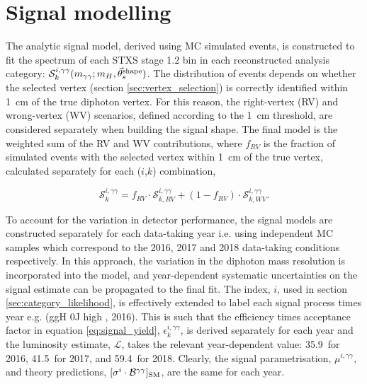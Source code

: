 \section{Signal modelling}\label{sec:sig_modelling}
The analytic signal model, derived using MC simulated events, is constructed to fit the \mgg spectrum of each STXS stage 1.2 bin in each reconstructed analysis category: $\mathcal{S}^{i,\gamma\gamma}_k(m_{\gamma\gamma};m_H,\vec{\theta}^{\rm{shape}}_s)$. The distribution of events depends on whether the selected vertex (section \ref{sec:vertex_selection}) is correctly identified within 1~cm of the true diphoton vertex. For this reason, the right-vertex (RV) and wrong-vertex (WV) scenarios, defined according to the 1~cm threshold, are considered separately when building the signal shape. The final model is the weighted sum of the RV and WV contributions, where $f_{RV}$ is the fraction of simulated events with the selected vertex within 1~cm of the true vertex, calculated separately for each ($i$,$k$) combination,

\begin{equation}
    \mathcal{S}^{i,\gamma\gamma}_k = f_{RV} \cdot \mathcal{S}^{i,\gamma\gamma}_{k,RV} + (1-f_{RV}) \cdot\mathcal{S}^{i,\gamma\gamma}_{k,WV}.
\end{equation}

To account for the variation in detector performance, the signal models are constructed separately for each data-taking year i.e. using independent MC samples which correspond to the 2016, 2017 and 2018 data-taking conditions respectively. In this approach, the variation in the diphoton mass resolution is incorporated into the model, and year-dependent systematic uncertainties on the signal estimate can be propagated to the final fit. The index, $i$, used in section \ref{sec:category_likelihood}, is effectively extended to label each signal process times year e.g. (ggH 0J high \ptH, 2016). This is such that the efficiency times acceptance factor in equation \ref{eq:signal_yield}, $\epsilon_k^{i,\gamma\gamma}$, is derived separately for each year and the luminosity estimate, $\mathcal{L}$, takes the relevant year-dependent value: 35.9~\fbinv for 2016, 41.5~\fbinv for 2017, and 59.4~\fbinv for 2018. Clearly, the signal parametrisation, $\mu^{i,\gamma\gamma}$, and theory predictions, $[\sigma^i \cdot \mathcal{B}^{\gamma\gamma}]_{\rm{SM}}$, are the same for each year.

